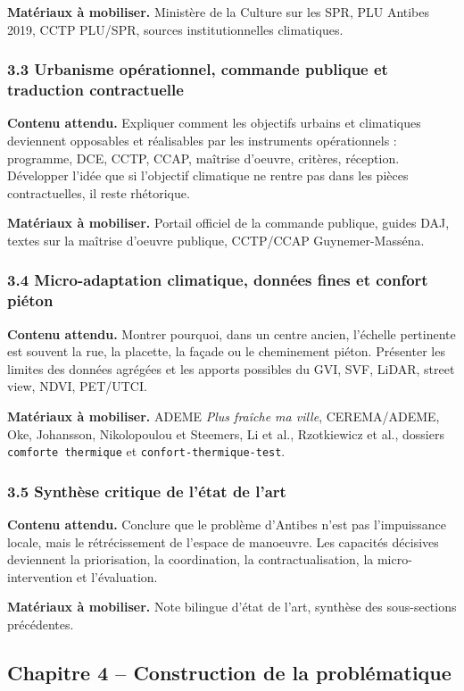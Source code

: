 \documentclass[11pt,a4paper]{article}
\begin{document}
\textbf{Matériaux à mobiliser.} Ministère de la Culture sur les SPR, PLU Antibes 2019, CCTP PLU/SPR, sources institutionnelles climatiques.

\subsubsection{3.3 Urbanisme opérationnel, commande publique et traduction contractuelle}
\textbf{Contenu attendu.} Expliquer comment les objectifs urbains et climatiques deviennent opposables et réalisables par les instruments opérationnels : programme, DCE, CCTP, CCAP, maîtrise d'oeuvre, critères, réception. Développer l'idée que si l'objectif climatique ne rentre pas dans les pièces contractuelles, il reste rhétorique.

\textbf{Matériaux à mobiliser.} Portail officiel de la commande publique, guides DAJ, textes sur la maîtrise d'oeuvre publique, CCTP/CCAP Guynemer-Masséna.

\subsubsection{3.4 Micro-adaptation climatique, données fines et confort piéton}
\textbf{Contenu attendu.} Montrer pourquoi, dans un centre ancien, l'échelle pertinente est souvent la rue, la placette, la façade ou le cheminement piéton. Présenter les limites des données agrégées et les apports possibles du GVI, SVF, LiDAR, street view, NDVI, PET/UTCI.

\textbf{Matériaux à mobiliser.} ADEME \emph{Plus fraîche ma ville}, CEREMA/ADEME, Oke, Johansson, Nikolopoulou et Steemers, Li et al., Rzotkiewicz et al., dossiers \texttt{comforte thermique} et \texttt{confort-thermique-test}.

\subsubsection{3.5 Synthèse critique de l'état de l'art}
\textbf{Contenu attendu.} Conclure que le problème d'Antibes n'est pas l'impuissance locale, mais le rétrécissement de l'espace de manoeuvre. Les capacités décisives deviennent la priorisation, la coordination, la contractualisation, la micro-intervention et l'évaluation.

\textbf{Matériaux à mobiliser.} Note bilingue d'état de l'art, synthèse des sous-sections précédentes.

\subsection{Chapitre 4 -- Construction de la problématique}
\end{document}
